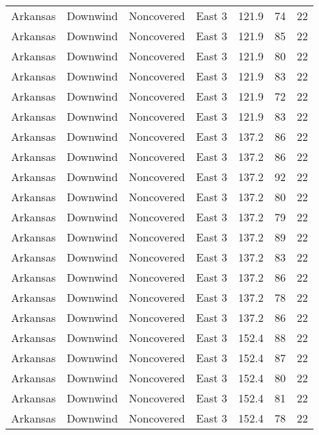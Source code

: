 \documentclass{article}
\begin{document}
\begin{longtable}[H]{ccccccc}
Arkansas & Downwind  & Noncovered & East 3        & 121.9        & 74          & 22  \\
Arkansas & Downwind  & Noncovered & East 3        & 121.9        & 85          & 22  \\
Arkansas & Downwind  & Noncovered & East 3        & 121.9        & 80          & 22  \\
Arkansas & Downwind  & Noncovered & East 3        & 121.9        & 83          & 22  \\
Arkansas & Downwind  & Noncovered & East 3        & 121.9        & 72          & 22  \\
Arkansas & Downwind  & Noncovered & East 3        & 121.9        & 83          & 22  \\
Arkansas & Downwind  & Noncovered & East 3        & 137.2        & 86          & 22  \\
Arkansas & Downwind  & Noncovered & East 3        & 137.2        & 86          & 22  \\
Arkansas & Downwind  & Noncovered & East 3        & 137.2        & 92          & 22  \\
Arkansas & Downwind  & Noncovered & East 3        & 137.2        & 80          & 22  \\
Arkansas & Downwind  & Noncovered & East 3        & 137.2        & 79          & 22  \\
Arkansas & Downwind  & Noncovered & East 3        & 137.2        & 89          & 22  \\
Arkansas & Downwind  & Noncovered & East 3        & 137.2        & 83          & 22  \\
Arkansas & Downwind  & Noncovered & East 3        & 137.2        & 86          & 22  \\
Arkansas & Downwind  & Noncovered & East 3        & 137.2        & 78          & 22  \\
Arkansas & Downwind  & Noncovered & East 3        & 137.2        & 86          & 22  \\
Arkansas & Downwind  & Noncovered & East 3        & 152.4        & 88          & 22  \\
Arkansas & Downwind  & Noncovered & East 3        & 152.4        & 87          & 22  \\
Arkansas & Downwind  & Noncovered & East 3        & 152.4        & 80          & 22  \\
Arkansas & Downwind  & Noncovered & East 3        & 152.4        & 81          & 22  \\
Arkansas & Downwind  & Noncovered & East 3        & 152.4        & 78          & 22  \\

\end{longtable}
\end{document}
